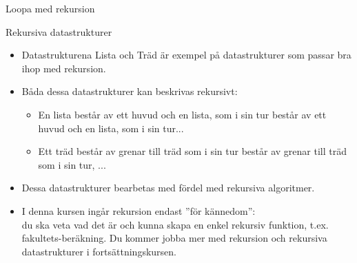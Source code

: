 \begin{Slide}{Loopa med rekursion}
\end{Slide} 


\begin{Slide}{Rekursiva datastrukturer}

\begin{itemize}
\item Datastrukturena Lista och Träd är exempel på datastrukturer som passar bra ihop med rekursion. 
\item Båda dessa datastrukturer kan beskrivas rekursivt:
\begin{itemize}
\item En lista består av ett huvud och en lista, som i sin tur består av ett huvud och en lista, som i sin tur...
\item Ett träd består av grenar till träd som i sin tur består av grenar till träd som i sin tur, ...
\end{itemize}
\item Dessa datastrukturer bearbetas med fördel med rekursiva algoritmer.
\item I denna kursen ingår rekursion endast ''för kännedom'': \\ du ska veta vad det är och kunna skapa en enkel rekursiv funktion, t.ex. fakultets-beräkning. Du kommer jobba mer med rekursion och rekursiva datastrukturer i fortsättningskursen.
\end{itemize}
\end{Slide} 

